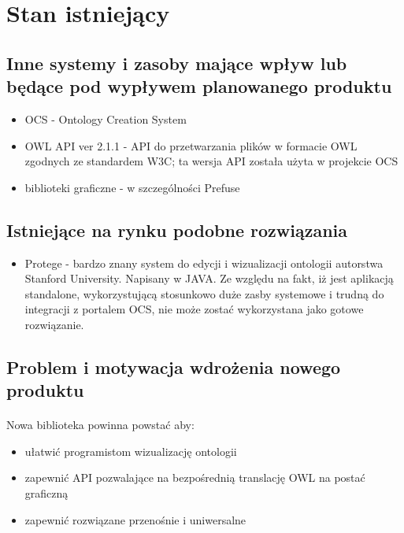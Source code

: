 \documentclass[a4paper,10pt]{article}
\begin{document}
\section{Stan istniejący}

\subsection{Inne systemy i zasoby mające wpływ lub będące pod wypływem planowanego produktu}

\begin{itemize}
 	\item OCS - Ontology Creation System 
	\item OWL API ver 2.1.1 - API do przetwarzania plików w formacie OWL zgodnych ze standardem W3C; ta wersja API została użyta w projekcie OCS
	\item biblioteki graficzne - w szczególności Prefuse
\end{itemize}


\subsection{Istniejące na rynku podobne rozwiązania}

\begin{itemize}
 \item Protege - bardzo znany system do edycji i wizualizacji ontologii autorstwa Stanford University. Napisany w JAVA. Ze względu na fakt, iż jest aplikacją standalone, wykorzystującą stosunkowo duże zasby systemowe i trudną do integracji z portalem OCS, nie może zostać wykorzystana jako gotowe rozwiązanie.

\end{itemize}

\subsection{Problem i motywacja wdrożenia nowego produktu}
\paragraph{} Nowa biblioteka powinna powstać aby:
\begin{itemize}
 \item ułatwić programistom wizualizację ontologii
\item zapewnić API pozwalające na bezpośrednią translację OWL na postać graficzną
\item zapewnić rozwiązane przenośnie i uniwersalne
\end{itemize}
\end{document}
